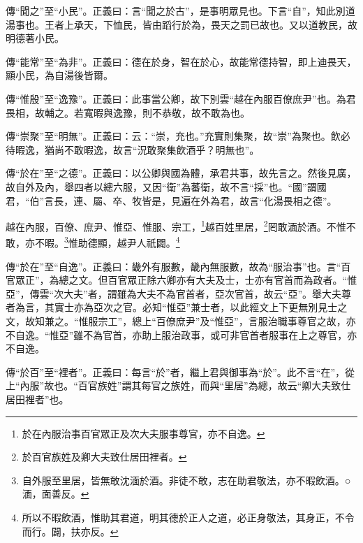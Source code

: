 {\noindent\zhuan{}\fzbyks 傳“聞之”至“小民”。正義曰：言“聞之於古”，是事明眾見也。下言“自”，知此別道湯事也。王者上承天，下恤民，皆由蹈行於為，畏天之罰已故也。又以道教民，故明德著小民。 \par}

{\noindent\zhuan{}\fzbyks 傳“能常”至“為非”。正義曰：德在於身，智在於心，故能常德持智，即上迪畏天，顯小民，為自湯後皆爾。 \par}

{\noindent\zhuan{}\fzbyks 傳“惟殷”至“逸豫”。正義曰：此事當公卿，故下別雲“越在內服百僚庶尹”也。為君畏相，故輔之。若寬暇與逸豫，則不恭敬，故不敢為也。 \par}

{\noindent\zhuan{}\fzbyks 傳“崇聚”至“明無”。正義曰：云：“崇，充也。”充實則集聚，故“崇”為聚也。飲必待暇逸，猶尚不敢暇逸，故言“況敢聚集飲酒乎？明無也”。 \par}

{\noindent\zhuan{}\fzbyks 傳“於在”至“之德”。正義曰：以公卿與國為體，承君共事，故先言之。然後見廣，故自外及內，舉四者以總六服，又因“衛”為蕃衛，故不言“採”也。“國”謂國君，“伯”言長，連、屬、卒、牧皆是，見遍在外為君，故言“化湯畏相之德”。 \par}

越在內服，百僚、庶尹、惟亞、惟服、宗工，\footnote{於在內服治事百官眾正及次大夫服事尊官，亦不自逸。}越百姓里居，\footnote{於百官族姓及卿大夫致仕居田裡者。}罔敢湎於酒。不惟不敢，亦不暇。\footnote{自外服至里居，皆無敢沈湎於酒。非徒不敢，志在助君敬法，亦不暇飲酒。○湎，面善反。}惟助德顯，越尹人祇闢。\footnote{所以不暇飲酒，惟助其君道，明其德於正人之道，必正身敬法，其身正，不令而行。闢，扶亦反。}

{\noindent\zhuan{}\fzbyks 傳“於在”至“自逸”。正義曰：畿外有服數，畿內無服數，故為“服治事”也。言“百官眾正”，為總之文。但百官眾正除六卿亦有大夫及士，士亦有官首而為政者。“惟亞”，傳雲“次大夫”者，謂雖為大夫不為官首者，亞次官首，故云“亞”。舉大夫尊者為言，其實士亦為亞次之官。必知“惟亞”兼士者，以此經文上下更無別見士之文，故知兼之。“惟服宗工”，總上“百僚庶尹”及“惟亞”，言服治職事尊官之故，亦不自逸。“惟亞”雖不為官首，亦助上服治政事，或可非官首者服事在上之尊官，亦不自逸。 \par}

{\noindent\zhuan{}\fzbyks 傳“於百”至“裡者”。正義曰：每言“於”者，繼上君與御事為“於”。此不言“在”，從上“內服”故也。“百官族姓”謂其每官之族姓，而與“里居”為總，故云“卿大夫致仕居田裡者”也。 \par}

